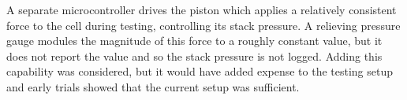 A separate microcontroller drives the piston which applies a relatively consistent force to the cell during testing, controlling its stack pressure. A relieving pressure gauge modules the magnitude of this force to a roughly constant value, but it does not report the value and so the stack pressure is not logged. Adding this capability was considered, but it would have added expense to the testing setup and early trials showed that the current setup was sufficient. 